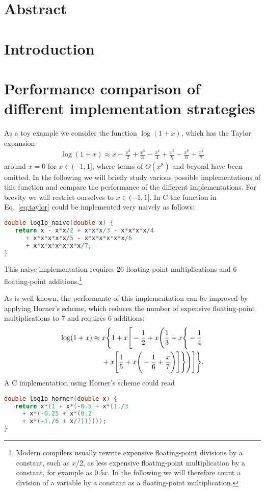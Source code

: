 \documentclass[10pt,DIV16,twocolumn]{scrartcl}
\title{\mytitle}
\author{\myauthor}
\affil{Fachbereich Energie und Biotechnologie, Hochschule Flensburg,\\ Kanzleistra{\ss}e 91--93, 24943 Flensburg, Germany}
\date{\today}
\begin{document}
\maketitle

\section*{Abstract}

\section{Introduction}

\cite{polylogarithm}

\section{Performance comparison of different implementation strategies}

As a toy example we consider the function $\log(1+x)$, which has the
Taylor expansion
%
\begin{align}
  \log(1+x) \approx x - \frac{x^2}{2} + \frac{x^3}{3} - \frac{x^4}{4} + \frac{x^5}{5} - \frac{x^6}{6} + \frac{x^7}{7}
  \label{eq:taylor}
\end{align}
%
around $x=0$ for $x\in(-1,1]$, where terms of $O(x^8)$ and beyond have
been omitted.  In the following we will briefly study various possible
implementations of this function and compare the performance of the
different implementations.  For brevity we will restrict ourselves to
$x\in(-1,1]$.  In C the function in Eq.~\eqref{eq:taylor} could be
implemented very naively as follows:
%
\begin{lstlisting}[language=C]
double log1p_naive(double x) {
   return x - x*x/2 + x*x*x/3 - x*x*x*x/4
      + x*x*x*x*x/5 - x*x*x*x*x*x/6
      + x*x*x*x*x*x*x/7;
}
\end{lstlisting}
%
This naive implementation requires 26 floating-point multiplications
and 6 floating-point additions.\footnote{Modern compilers usually
  rewrite expensive floating-point divisions by a constant, such as
  $x/2$, as less expensive floating-point multiplication by a
  constant, for example as $0.5x$.  In the following we will therefore
  count a division of a variable by a constant as a floating-point
  multiplication.}

As is well known, the performante of this implementation can be
improved by applying Horner's scheme, which reduces the number of
expensive floating-point multiplications to 7 and requires 6
additions:
%
\begin{align}
  \log(1+x) \approx{}& x \Bigg\{1 + x \Bigg[-\frac{1}{2} + x \Bigg(\frac{1}{3} + x \Bigg\{-\frac{1}{4}  \notag \\
  &+ x \Bigg[\frac{1}{5} + x\Bigg(-\frac{1}{6} + \frac{x}{7}\Bigg)\Bigg]\Bigg\}\Bigg)\Bigg]\Bigg\}.
  \label{eq:horner}
\end{align}
%
A C implementation using Horner's scheme could read
%
\begin{lstlisting}[language=C]
double log1p_horner(double x) {
   return x*(1 + x*(-0.5 + x*(1./3
     + x*(-0.25 + x*(0.2
     + x*(-1./6 + x/7))))));
}
\end{lstlisting}
\end{document}
